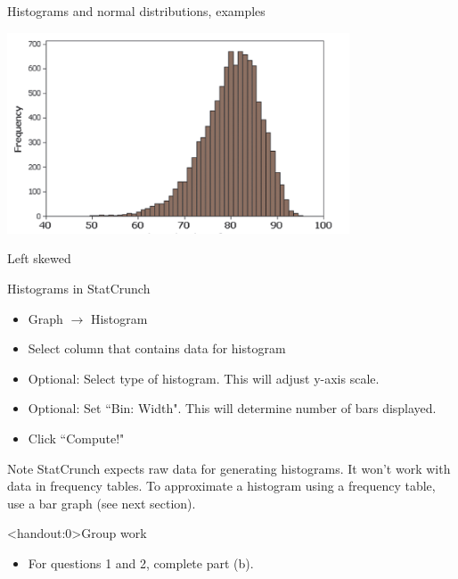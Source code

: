 \documentclass{beamer}
\begin{document}
\begin{frame}{Histograms and normal distributions, examples}

{\centering
\includegraphics[width=4in]{../images/ch02_hist_lskew}
\par}
\bigskip
\pause
\begin{block}{}
\centering \large Left skewed
\end{block}
\end{frame}

\begin{frame}{Histograms in StatCrunch}
\begin{block}{}
\begin{itemize}
\item Graph $\to$ Histogram
\item Select column that contains data for histogram
\item Optional: Select type of histogram. This will adjust y-axis scale.
\item Optional: Set ``Bin: Width". This will determine number of bars displayed.
\item Click ``Compute!"
\end{itemize}
\end{block}

\begin{alertblock}{Note}
StatCrunch expects raw data for generating histograms. It won't work with data in frequency tables. To approximate a histogram using a frequency table, use a bar graph (see next section).
\end{alertblock}
\end{frame}

\begin{frame}<handout:0>{Group work}
\begin{block}{}
\large
\begin{itemize}
\item For questions 1 and 2, complete part (b).
\end{itemize}
\end{block}
\end{frame}
\end{document}
